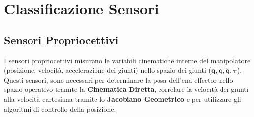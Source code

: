 ﻿\documentclass[11pt, a4paper]{article}
\begin{document}
\section{Classificazione Sensori}

\subsection{Sensori Propriocettivi}
I sensori propriocettivi misurano le variabili cinematiche interne del manipolatore (posizione, velocità, accelerazione dei giunti) nello spazio dei giunti ($\boldsymbol{q}, \dot{\boldsymbol{q}}, \ddot{\boldsymbol{q}}, \boldsymbol{\tau}$). Questi sensori, sono necessari per determinare la posa dell'end effector nello spazio operativo tramite la \textbf{Cinematica Diretta}, correlare la velocità dei giunti alla velocità cartesiana tramite lo \textbf{Jacobiano Geometrico} e per utilizzare gli algoritmi di controllo della posizione.
\end{document}
